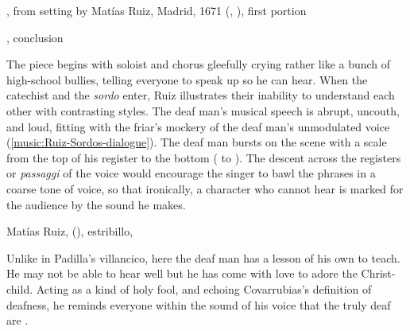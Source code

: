 \begin{poemexample}
    \caption{,
    from setting by Matías Ruiz, Madrid, 1671 (,
    ), first portion}

    \label{poem:Pues_la_fiesta-Ruiz-1}

\end{poemexample}

\begin{poemexample}
    \caption{,
    conclusion}

    \label{poem:Pues_la_fiesta-Ruiz-2}

\end{poemexample}

The piece begins with soloist and chorus gleefully crying  rather like a bunch of high-school bullies, telling everyone to speak
up so he can hear.
When the catechist and the \emph{sordo} enter, Ruiz illustrates their inability
to understand each other with contrasting styles.
The deaf man's musical speech is abrupt, uncouth, and loud, fitting with the
friar's mockery of the deaf man's unmodulated voice
(\cref{music:Ruiz-Sordos-dialogue}).
The deaf man bursts on the scene with a scale from the top of his register to
the bottom ( to ).
The descent across the registers or \emph{passaggi} of the voice would encourage
the singer to bawl the phrases in a coarse tone of voice, so that ironically, a
character who cannot hear is marked for the audience by the sound he makes.

\begin{musicexample}
    \caption{Matías Ruiz,  (), estribillo, }

    \label{music:Ruiz-Sordos-dialogue}

\end{musicexample}

Unlike in Padilla's villancico, here the deaf man has a lesson of his own to
teach.
He may not be able to hear well but he has come with love to adore the
Christ-child.
Acting as a kind of holy fool, and echoing Covarrubias's definition of deafness,
he reminds everyone within the sound of his voice that the truly deaf are
.

